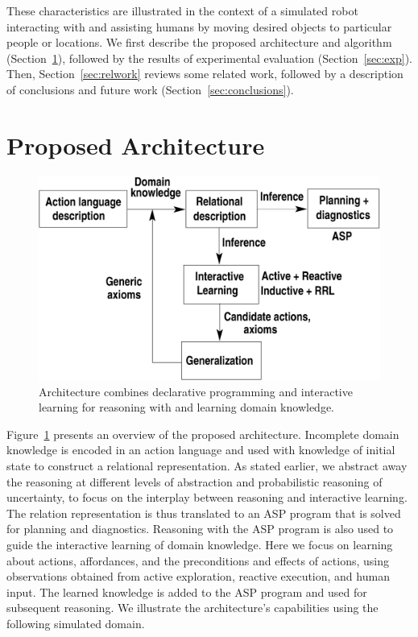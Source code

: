 \documentclass{article}
\begin{document}
These characteristics are illustrated in the context of a simulated
robot interacting with and assisting humans by moving desired objects
to particular people or locations. We first describe the proposed
architecture and algorithm (Section~\ref{sec:arch}), followed by the
results of experimental evaluation (Section~\ref{sec:exp}). Then,
Section~\ref{sec:relwork} reviews some related work, followed by a
description of conclusions and future work
(Section~\ref{sec:conclusions}).


\section{Proposed Architecture}
\label{sec:arch}

\begin{figure}[tb]
  \begin{center}
    \includegraphics[width=\columnwidth]{./Images/overview}
  \end{center}
  \caption{Architecture combines declarative programming and
    interactive learning for reasoning with and learning domain
    knowledge.}
  \label{fig:overview}
\end{figure}

Figure~\ref{fig:overview} presents an overview of the proposed
architecture. Incomplete domain knowledge is encoded in an action
language and used with knowledge of initial state to construct a
relational representation. As stated earlier, we abstract away the
reasoning at different levels of abstraction and probabilistic
reasoning of uncertainty, to focus on the interplay between reasoning
and interactive learning. The relation representation is thus
translated to an ASP program that is solved for planning and
diagnostics. Reasoning with the ASP program is also used to guide the
interactive learning of domain knowledge. Here we focus on learning
about actions, affordances, and the preconditions and effects of
actions, using observations obtained from active exploration, reactive
execution, and human input. The learned knowledge is added to the ASP
program and used for subsequent reasoning. We illustrate the
architecture's capabilities using the following simulated domain.
\end{document}
